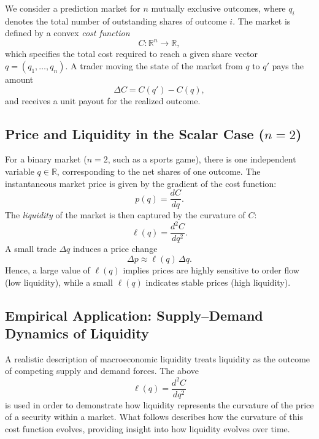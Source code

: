 \documentclass{article}
\begin{document}
We consider a prediction market for \( n \) mutually exclusive outcomes, where \(q_i\) denotes the total number of outstanding shares of outcome \(i\). The market is defined by a convex \emph{cost function}
\begin{equation}
C : \mathbb{R}^n \to \mathbb{R},
\end{equation}
which specifies the total cost required to reach a given share vector \(q = (q_1, \ldots, q_n)\).  
A trader moving the state of the market from \(q\) to \(q'\) pays the amount
\begin{equation}
\Delta C = C(q') - C(q),
\end{equation}
and receives a unit payout for the realized outcome.

\subsection*{Price and Liquidity in the Scalar Case (\(n=2\))}

For a binary market (\(n=2\),  such as a sports game), there is one independent variable \(q \in \mathbb{R}\), corresponding to the net shares of one outcome.  
The instantaneous market price is given by the gradient of the cost function:
\begin{equation}
p(q) = \frac{dC}{dq}.
\end{equation}
The \emph{liquidity} of the market is then captured by the curvature of \(C\):
\begin{equation}
\ell(q) = \frac{d^2 C}{dq^2}.
\end{equation}
A small trade \(\Delta q\) induces a price change
\begin{equation}
\Delta p \approx \ell(q)\,\Delta q.
\end{equation}
Hence, a large value of \(\ell(q)\) implies prices are highly sensitive to order flow (low liquidity), while a small \(\ell(q)\) indicates stable prices (high liquidity).  

\subsection*{Empirical Application: Supply--Demand Dynamics of Liquidity}

A realistic description of macroeconomic liquidity treats liquidity as the outcome of competing supply and demand forces. The above \[\ell(q) = \frac{d^2 C}{dq^2}\] is used in order to demonstrate how liquidity represents the curvature of the price of a security within a market. What follows describes how the curvature of this cost function evolves, providing insight into how liquidity evolves over time.
\end{document}
